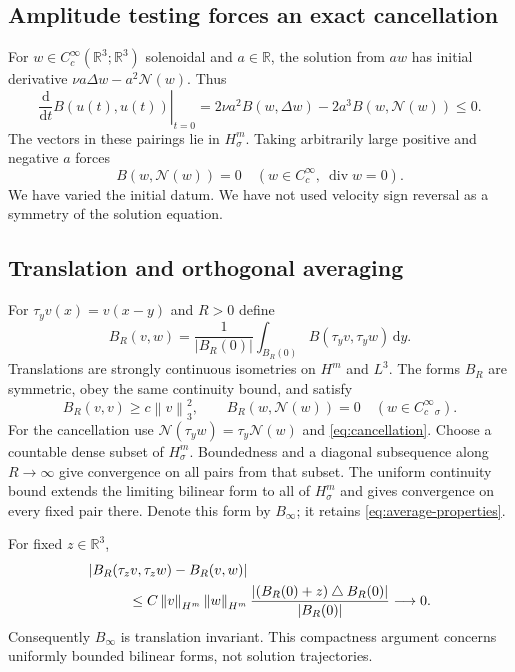\documentclass[11pt]{article}
\theoremstyle{remark}
\newcommand{\R}{\mathbb R}
\newcommand{\N}{\mathcal N}
\newcommand{\diver}{\operatorname{div}}
\newcommand{\norm}[1]{\left\lVert#1\right\rVert}
\newcommand{\dd}{\,\mathrm d}
\begin{document}
\subsection{Amplitude testing forces an exact cancellation}
For $w\in C_c^\infty(\R^3;\R^3)$ solenoidal and $a\in\R$, the solution
from $aw$ has initial derivative $\nu a\Delta w-a^2\N(w)$. Thus
\begin{equation}
 \left.\frac{\mathrm d}{\mathrm dt}B(u(t),u(t))\right|_{t=0}
 =2\nu a^2B(w,\Delta w)-2a^3B(w,\N(w))\le0.\label{eq:amplitude}
\end{equation}
The vectors in these pairings lie in $H^m_\sigma$. Taking arbitrarily large
positive and negative $a$ forces
\begin{equation}
                 B(w,\N(w))=0
 \quad(w\in C_c^\infty,\ \diver w=0).\label{eq:cancellation}
\end{equation}
We have varied the initial datum. We have not used velocity sign reversal
as a symmetry of the solution equation.

\subsection{Translation and orthogonal averaging}
For $\tau_yv(x)=v(x-y)$ and $R>0$ define
\begin{equation}
 B_R(v,w)=\frac{1}{|B_R(0)|}\int_{B_R(0)}
                         B(\tau_yv,\tau_yw)\dd y.
\end{equation}
Translations are strongly continuous isometries on $H^m$ and $L^3$.
The forms $B_R$ are symmetric, obey the same continuity bound, and satisfy
\begin{equation}
 B_R(v,v)\ge c\norm v_3^2,
 \qquad B_R(w,\N(w))=0\quad(w\in C_c^\infty{}_\sigma).
 \label{eq:average-properties}
\end{equation}
For the cancellation use $\N(\tau_yw)=\tau_y\N(w)$ and
\eqref{eq:cancellation}. Choose a countable dense subset of $H^m_\sigma$.
Boundedness and a diagonal subsequence along $R\to\infty$ give convergence
on all pairs from that subset. The uniform continuity bound extends the
limiting bilinear form to all of $H^m_\sigma$ and gives convergence on
every fixed pair there. Denote this form by $B_\infty$; it retains
\eqref{eq:average-properties}.

For fixed $z\in\R^3$,
\begin{align}
 &|B_R(\tau_zv,\tau_zw)-B_R(v,w)|\notag\\
 &\hspace{1cm}\le C\norm v_{H^m}\norm w_{H^m}
 \frac{|(B_R(0)+z)\mathbin\triangle B_R(0)|}{|B_R(0)|}
 \longrightarrow0.
\end{align}
Consequently $B_\infty$ is translation invariant. This compactness argument
concerns uniformly bounded bilinear forms, not solution trajectories.
\end{document}
